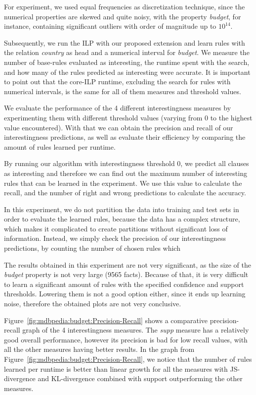 For experiment, we used equal frequencies as discretization technique, since the numerical properties are skewed and
quite noisy, with the property \emph{budget}, for instance, containing significant outliers with order of magnitude up
to $10^{14}$.

Subsequently, we run the ILP with our proposed extension and learn rules with the relation \emph{country} as head and a
numerical interval for \emph{budget}. We measure the number of base-rules evaluated as interesting, the runtime spent
with the search, and how many of the rules predicted as interesting were accurate. It is important to point out that
the core-ILP runtime, excluding the search for rules with numerical intervals, is the same for all of them measures and
threshold values. 

We evaluate the performance of the 4 different interestingness measures by experimenting them with different threshold
values (varying from 0 to the highest value encountered). With that we can obtain the precision and recall of our
interestingness predictions, as well as evaluate their efficiency by comparing the amount of rules learned per runtime.

By running our algorithm with interestingness threshold 0, we predict all clauses as interesting and therefore we can
find out the maximum number of interesting rules that can be learned in the experiment. We use this value to calculate
the recall, and the number of right and wrong predictions to calculate the accuracy.


In this experiment, we do not partition the data into training and test sets in order to evaluate the learned rules,
because the data has a complex structure, which makes it complicated to create partitions without significant loss of
information. Instead, we simply check the precision of our interestingness predictions, by counting the number of chosen
rules which 

The results obtained in this experiment are not very significant, as the size of the \emph{budget} property is
not very large (9565 facts). Because of that, it is very difficult to learn a significant amount of rules with the
specified confidence and support thresholds. Lowering them is not a good option either, since it ends up learning
noise, therefore the obtained plots are not very conclusive.

Figure~\ref{fig:mdbpedia:budget:Precision-Recall} shows a comparative precision-recall graph of the 4
interestingness measures. The \emph{supp} measure has a relatively good overall performance, however its
precision is bad for low recall values, with all the other measures having better results. In the graph from
Figure~\ref{fig:mdbpedia:budget:Precision-Recall}, we notice that the number of rules learned per runtime is better
than linear growth for all the measures with JS-divergence and KL-divergence combined with support outperforming the
other measures.

